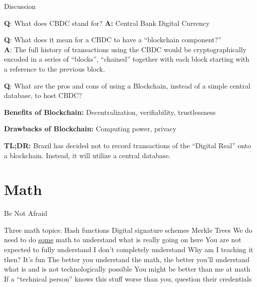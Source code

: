 \documentclass[aspectratio=169]{beamer}
\begin{document}
\begin{frame}{Discussion}

\textbf{Q}: What does CBDC stand for? \pause \textbf{A:} Central Bank Digital Currency \\ \pause 

\textbf{Q}: What does it mean for a CBDC to have a ``blockchain component?'' \\ \pause 
\textbf{A}: The full history of transactions using the CBDC would be cryptographically encoded in a series of ``blocks'', ``chained'' together with each block starting with a reference to the previous block. \\ \pause 

\textbf{Q}: What are the pros and cons of using a Blockchain, instead of a simple central database, to host CBDC?  \\ \pause 

\textbf{Benefits of Blockchain:} Decentralization, verifiability, trustlessness  \\ \pause 

\textbf{Drawbacks of Blockchain:} Computing power, privacy \\ \pause 

\textbf{TL;DR:} Brazil has decided not to record transactions of the ``Digital Real'' onto a blockchain. Instead, it will utilize a central database. 
    
\end{frame}

\section{Math}

\begin{frame}{Be Not Afraid}
    
\bi
\m Three math topics:
\bi
\m Hash functions
\m Digital signature schemes
\m Merkle Trees
\ei \pause
\m We do need to do \ul{some} math to understand what is really going on here
\bi
\m You are not expected to fully understand
\m I don't completely understand 
\ei \pause
\m Why am I teaching it then? \pause 
\bi
\m It's fun \pause 
\m The better you understand the math, the better you'll understand what is and is not technologically possible \pause 
\m You might be better than me at math \pause 
\m If a ``technical person'' knows this stuff worse than you, question their credentials 
\ei
\ei

\end{frame}
\end{document}
